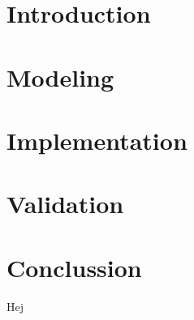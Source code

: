 \documentclass[11pt,a4paper,fleqn]{article}
\begin{document}

\newpage

\tableofcontents
\newpage


\section{Introduction}%
\label{sec:introduction}


\section{Modeling}%
\label{sec:modeling}


\section{Implementation}%
\label{sec:implementation}


\section{Validation}%
\label{sec:validation}


\section{Conclussion}%
\label{sec:conlclussion}



Hej ~\cite{Nobody06}

{}

\end{document}
